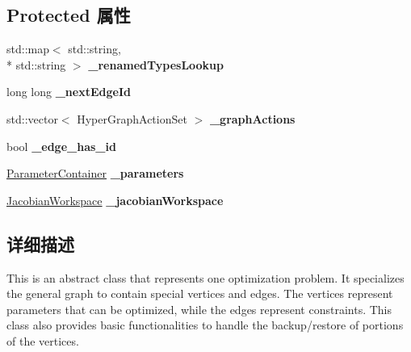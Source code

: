 \subsection*{Protected 属性}
\begin{DoxyCompactItemize}
\item 
\hypertarget{structg2o_1_1OptimizableGraph_a726ab6d0b04b12f835b690d54e061731}{std\-::map$<$ std\-::string, \\*
std\-::string $>$ {\bfseries \-\_\-renamed\-Types\-Lookup}}\label{structg2o_1_1OptimizableGraph_a726ab6d0b04b12f835b690d54e061731}

\item 
\hypertarget{structg2o_1_1OptimizableGraph_a93a7f05b31bca9ccaa214499f042739a}{long long {\bfseries \-\_\-next\-Edge\-Id}}\label{structg2o_1_1OptimizableGraph_a93a7f05b31bca9ccaa214499f042739a}

\item 
\hypertarget{structg2o_1_1OptimizableGraph_a5e6a371ad7709692e52886ecf3e7250c}{std\-::vector$<$ Hyper\-Graph\-Action\-Set $>$ {\bfseries \-\_\-graph\-Actions}}\label{structg2o_1_1OptimizableGraph_a5e6a371ad7709692e52886ecf3e7250c}

\item 
\hypertarget{structg2o_1_1OptimizableGraph_a260451b25094e5e929cc2841e31242f4}{bool {\bfseries \-\_\-edge\-\_\-has\-\_\-id}}\label{structg2o_1_1OptimizableGraph_a260451b25094e5e929cc2841e31242f4}

\item 
\hypertarget{structg2o_1_1OptimizableGraph_a3a7974befcd934f28a36de3999423d21}{\hyperlink{classg2o_1_1ParameterContainer}{Parameter\-Container} {\bfseries \-\_\-parameters}}\label{structg2o_1_1OptimizableGraph_a3a7974befcd934f28a36de3999423d21}

\item 
\hypertarget{structg2o_1_1OptimizableGraph_a161c01a29d09cca22e223ab2048eaba8}{\hyperlink{classg2o_1_1JacobianWorkspace}{Jacobian\-Workspace} {\bfseries \-\_\-jacobian\-Workspace}}\label{structg2o_1_1OptimizableGraph_a161c01a29d09cca22e223ab2048eaba8}

\end{DoxyCompactItemize}


\subsection{详细描述}
This is an abstract class that represents one optimization problem. It specializes the general graph to contain special vertices and edges. The vertices represent parameters that can be optimized, while the edges represent constraints. This class also provides basic functionalities to handle the backup/restore of portions of the vertices. 

